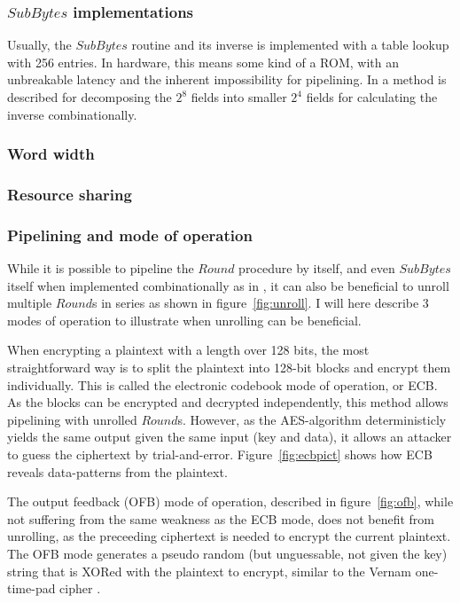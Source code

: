 \subsubsection{$SubBytes$ implementations}

Usually, the $SubBytes$ routine and its inverse is implemented with a
table lookup with 256 entries. In hardware, this means some kind of a
ROM, with an unbreakable latency and the inherent impossibility for
pipelining. In \cite{csbox} a method is described for decomposing the
$2^8$ fields into smaller $2^4$ fields for calculating the inverse
combinationally.

\subsubsection{Word width}

\subsubsection{Resource sharing}


\subsubsection{Pipelining and mode of operation}

While it is possible to pipeline the $Round$ procedure by itself, and
even $SubBytes$ itself when implemented combinationally as in
\cite{csbox}, it can also be beneficial to unroll multiple $Round$s in
series as shown in figure~\ref{fig:unroll}. I will here describe 3
modes of operation to illustrate when unrolling can be beneficial.

When encrypting a plaintext with a length over 128 bits, the most
straightforward way is to split the plaintext into 128-bit blocks and
encrypt them individually. This is called the electronic codebook mode
of operation, or ECB. As the blocks can be encrypted and decrypted
independently, this method allows pipelining with unrolled
$Round$s. However, as the AES-algorithm deterministicly yields the
same output given the same input (key and data), it allows an attacker
to guess the ciphertext by trial-and-error. Figure~\ref{fig:ecbpict}
shows how ECB reveals data-patterns from the plaintext.

The output feedback (OFB) mode of operation, described in
figure~\ref{fig:ofb}, while not suffering from the same weakness as
the ECB mode, does not benefit from unrolling, as the preceeding
ciphertext is needed to encrypt the current plaintext. The OFB mode
generates a pseudo random (but unguessable, not given the key) string
that is XORed with the plaintext to encrypt, similar to the Vernam
one-time-pad cipher \cite{vernam}.

